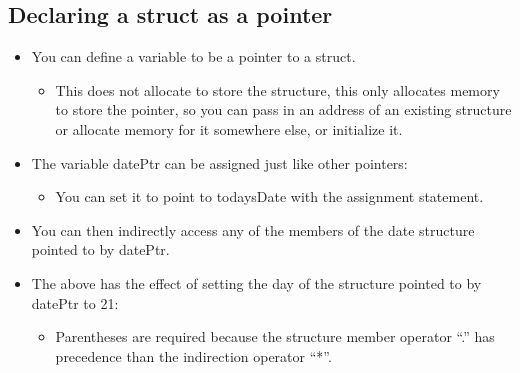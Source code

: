 \subsection{Declaring a struct as a pointer}
\begin{itemize}
    \item You can define a variable to be a pointer to a struct.
        \begin{itemize}
            \item This does not allocate to store the structure, this only allocates memory to store the pointer, so you can pass in an address of an existing structure or allocate memory for it somewhere else, or initialize it. 
        \end{itemize}
    
    \item The variable datePtr can be assigned just like other pointers:
        \begin{itemize}
            \item You can set it to point to todaysDate with the assignment statement. 
        \end{itemize}
    
    \item You can then indirectly access any of the members of the date structure pointed to by datePtr.
    
    \item The above has the effect of setting the day of the structure pointed to by datePtr to 21:
        \begin{itemize}
            \item Parentheses are required because the structure member operator ``.'' has precedence than the indirection operator ``*''.
        \end{itemize}
\end{itemize}

